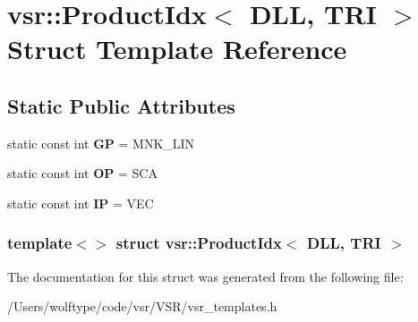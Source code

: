 \hypertarget{structvsr_1_1_product_idx_3_01_d_l_l_00_01_t_r_i_01_4}{\section{vsr\-:\-:Product\-Idx$<$ D\-L\-L, T\-R\-I $>$ Struct Template Reference}
\label{structvsr_1_1_product_idx_3_01_d_l_l_00_01_t_r_i_01_4}
}
\subsection*{Static Public Attributes}
\begin{DoxyCompactItemize}
\item 
\hypertarget{structvsr_1_1_product_idx_3_01_d_l_l_00_01_t_r_i_01_4_a040c9dd2228ef0e856a27bf8c0f0479e}{static const int {\bfseries G\-P} = M\-N\-K\-\_\-\-L\-I\-N}\label{structvsr_1_1_product_idx_3_01_d_l_l_00_01_t_r_i_01_4_a040c9dd2228ef0e856a27bf8c0f0479e}

\item 
\hypertarget{structvsr_1_1_product_idx_3_01_d_l_l_00_01_t_r_i_01_4_a12281dc3e252db8fa923f5c5341c58a3}{static const int {\bfseries O\-P} = S\-C\-A}\label{structvsr_1_1_product_idx_3_01_d_l_l_00_01_t_r_i_01_4_a12281dc3e252db8fa923f5c5341c58a3}

\item 
\hypertarget{structvsr_1_1_product_idx_3_01_d_l_l_00_01_t_r_i_01_4_aadd27aff14aa322012842fa23ca5ea9e}{static const int {\bfseries I\-P} = V\-E\-C}\label{structvsr_1_1_product_idx_3_01_d_l_l_00_01_t_r_i_01_4_aadd27aff14aa322012842fa23ca5ea9e}

\end{DoxyCompactItemize}
\subsubsection*{template$<$$>$ struct vsr\-::\-Product\-Idx$<$ D\-L\-L, T\-R\-I $>$}



The documentation for this struct was generated from the following file\-:\begin{DoxyCompactItemize}
\item 
/\-Users/wolftype/code/vsr/\-V\-S\-R/vsr\-\_\-templates.\-h\end{DoxyCompactItemize}
